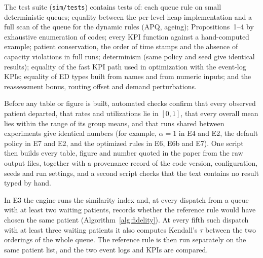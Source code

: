 The test suite (\texttt{sim/tests}) contains tests of: each queue rule on small deterministic queues; equality between the per-level heap implementation and a full scan of the queue for the dynamic rules (APQ, ageing); Propositions~1--4 by exhaustive enumeration of codes; every KPI function against a hand-computed example; patient conservation, the order of time stamps and the absence of capacity violations in full runs; determinism (same policy and seed give identical results); equality of the fast KPI path used in optimization with the event-log KPIs; equality of ED types built from names and from numeric inputs; and the reassessment bonus, routing offset and demand perturbations.

Before any table or figure is built, automated checks confirm that every observed patient departed, that rates and utilizations lie in $[0,1]$, that every overall mean lies within the range of its group means, and that runs shared between experiments give identical numbers (for example, $\alpha=1$ in E4 and E2, the default policy in E7 and E2, and the optimized rules in E6, E6b and E7). One script then builds every table, figure and number quoted in the paper from the raw output files, together with a provenance record of the code version, configuration, seeds and run settings, and a second script checks that the text contains no result typed by hand.

In E3 the engine runs the similarity index and, at every dispatch from a queue with at least two waiting patients, records whether the reference rule would have chosen the same patient (Algorithm~\ref{alg:fidelity}). At every fifth such dispatch with at least three waiting patients it also computes Kendall's $\tau$ between the two orderings of the whole queue. The reference rule is then run separately on the same patient list, and the two event logs and KPIs are compared.
